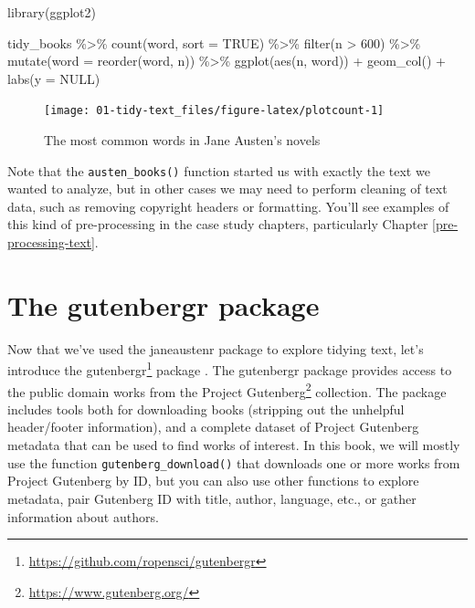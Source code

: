 \documentclass[
]{book}
\newenvironment{Shaded}{\begin{snugshade}}{\end{snugshade}}
\newcommand{\AttributeTok}[1]{\textcolor[rgb]{0.77,0.63,0.00}{#1}}
\newcommand{\ConstantTok}[1]{\textcolor[rgb]{0.00,0.00,0.00}{#1}}
\newcommand{\DecValTok}[1]{\textcolor[rgb]{0.00,0.00,0.81}{#1}}
\newcommand{\FunctionTok}[1]{\textcolor[rgb]{0.00,0.00,0.00}{#1}}
\newcommand{\NormalTok}[1]{#1}
\newcommand{\SpecialCharTok}[1]{\textcolor[rgb]{0.00,0.00,0.00}{#1}}
\DeclareRobustCommand{\href}[2]{#2\footnote{\url{#1}}}
\begin{document}
\begin{Shaded}
\begin{Highlighting}[]
\FunctionTok{library}\NormalTok{(ggplot2)}

\NormalTok{tidy\_books }\SpecialCharTok{\%\textgreater{}\%}
  \FunctionTok{count}\NormalTok{(word, }\AttributeTok{sort =} \ConstantTok{TRUE}\NormalTok{) }\SpecialCharTok{\%\textgreater{}\%}
  \FunctionTok{filter}\NormalTok{(n }\SpecialCharTok{\textgreater{}} \DecValTok{600}\NormalTok{) }\SpecialCharTok{\%\textgreater{}\%}
  \FunctionTok{mutate}\NormalTok{(}\AttributeTok{word =} \FunctionTok{reorder}\NormalTok{(word, n)) }\SpecialCharTok{\%\textgreater{}\%}
  \FunctionTok{ggplot}\NormalTok{(}\FunctionTok{aes}\NormalTok{(n, word)) }\SpecialCharTok{+}
  \FunctionTok{geom\_col}\NormalTok{() }\SpecialCharTok{+}
  \FunctionTok{labs}\NormalTok{(}\AttributeTok{y =} \ConstantTok{NULL}\NormalTok{)}
\end{Highlighting}
\end{Shaded}

\begin{figure}

{\centering \texttt{[image: 01-tidy-text\_files/figure-latex/plotcount-1]} 

}

\caption{The most common words in Jane Austen's novels}\label{fig:plotcount}
\end{figure}

Note that the \texttt{austen\_books()} function started us with exactly the text we wanted to analyze, but in other cases we may need to perform cleaning of text data, such as removing copyright headers or formatting. You'll see examples of this kind of pre-processing in the case study chapters, particularly Chapter \ref{pre-processing-text}.

\hypertarget{the-gutenbergr-package}{%
\section{The gutenbergr package}\label{the-gutenbergr-package}}

Now that we've used the janeaustenr package to explore tidying text, let's introduce the \href{https://github.com/ropensci/gutenbergr}{gutenbergr} package \citep{R-gutenbergr}. The gutenbergr package provides access to the public domain works from the \href{https://www.gutenberg.org/}{Project Gutenberg} collection. The package includes tools both for downloading books (stripping out the unhelpful header/footer information), and a complete dataset of Project Gutenberg metadata that can be used to find works of interest. In this book, we will mostly use the function \texttt{gutenberg\_download()} that downloads one or more works from Project Gutenberg by ID, but you can also use other functions to explore metadata, pair Gutenberg ID with title, author, language, etc., or gather information about authors.
\end{document}
